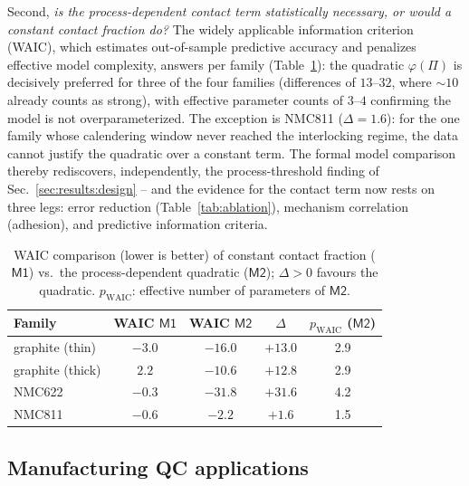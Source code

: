 \documentclass[10pt,a4paper]{article}
\newcommand{\Mone}{\ensuremath{\mathsf{M1}}}
\newcommand{\Mtwo}{\ensuremath{\mathsf{M2}}}
\begin{document}
Second, \emph{is the process-dependent contact term statistically necessary, or would a constant contact fraction do?} The widely applicable information criterion (WAIC), which estimates out-of-sample predictive accuracy and penalizes effective model complexity, answers per family (Table~\ref{tab:waic}): the quadratic $\varphi(\Pi)$ is decisively preferred for three of the four families (differences of $13$--$32$, where $\sim$$10$ already counts as strong), with effective parameter counts of $3$--$4$ confirming the model is not overparameterized. The exception is NMC811 ($\Delta=1.6$): for the one family whose calendering window never reached the interlocking regime, the data cannot justify the quadratic over a constant term. The formal model comparison thereby rediscovers, independently, the process-threshold finding of Sec.~\ref{sec:results:design} -- and the evidence for the contact term now rests on three legs: error reduction (Table~\ref{tab:ablation}), mechanism correlation (adhesion), and predictive information criteria.

\begin{table}[tb]\centering\small
\caption{WAIC comparison (lower is better) of constant contact fraction (\Mone) vs.\ the process-dependent quadratic (\Mtwo); $\Delta>0$ favours the quadratic. $p_{\mathrm{WAIC}}$: effective number of parameters of \Mtwo.}
\label{tab:waic}
\begin{tabular}{lcccc}
\toprule
Family & WAIC \Mone & WAIC \Mtwo & $\Delta$ & $p_{\mathrm{WAIC}}$ (\Mtwo)\\
\midrule
graphite (thin)  & $-3.0$ & $-16.0$ & $+13.0$ & 2.9\\
graphite (thick) & $2.2$  & $-10.6$ & $+12.8$ & 2.9\\
NMC622           & $-0.3$ & $-31.8$ & $+31.6$ & 4.2\\
NMC811           & $-0.6$ & $-2.2$  & $+1.6$  & 1.5\\
\bottomrule
\end{tabular}
\end{table}

\subsection{Manufacturing QC applications}
\label{sec:results:qc}
\end{document}
